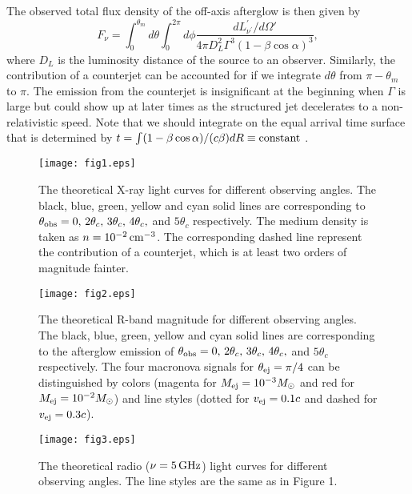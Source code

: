 \documentclass{emulateapj}
\def\beq{\begin{equation}}
\def\enq{\end{equation}}
\begin{document}
The observed total flux density of the off-axis afterglow is then given by \citep{dai01, gra02, kath17}
\beq
F_\nu=\int_0^{\theta_m}d\theta\int_0^{2\pi}d\phi\frac{dL_{\nu^{\prime}}^{\prime}/d\Omega'}{4\pi D_L^2\Gamma^3(1-\beta\cos\alpha)^3},
\enq
where $D_L$ is the luminosity distance of the source to an observer.
Similarly, the contribution of a counterjet can be accounted for if we integrate $d\theta$ from $\pi-\theta_m$ to $\pi$. The emission from the counterjet is insignificant at the beginning when $\Gamma$ is large but could show up at later times as the structured jet decelerates to a non-relativistic speed. Note that we should integrate on the equal arrival time surface that is determined by $t=\int(1-\beta\cos\alpha)/(c\beta)dR\equiv\rm constant$ \citep{wax97, pan98, sa98, huang00, mod00}.

\begin{figure}
\begin{center}
\texttt{[image: fig1.eps]}
\caption{The theoretical X-ray light curves for different observing angles. The black, blue, green, yellow and cyan solid lines are corresponding to $\theta_{\rm obs}=0,\, 2\theta_c,\, 3\theta_c,\,4\theta_c,$ and $ 5\theta_c$ respectively. The medium density is taken as $n=10^{-2}\,\rm cm^{-3}$. The corresponding dashed line represent the contribution of a counterjet, which is at least two orders of magnitude fainter.
\label{fig1}}
\end{center}
\end{figure}

\begin{figure}
\begin{center}
\texttt{[image: fig2.eps]}
\caption{The theoretical R-band magnitude for different observing angles. The black, blue, green, yellow and cyan solid lines are corresponding to the afterglow emission of $\theta_{\rm obs}=0,\, 2\theta_c,\, 3\theta_c,\,4\theta_c,$ and $5\theta_c$ respectively. The four macronova signals for $\theta_{\rm ej}=\pi/4$ can be distinguished by colors (magenta for $M_{\rm ej}=10^{-3}M_{\odot}$ and red for $M_{\rm ej}=10^{-2}M_{\odot}$) and line styles (dotted for $v_{\rm ej}=0.1c$ and dashed for $v_{\rm ej}=0.3c$).
\label{fig2}}
\end{center}
\end{figure}

\begin{figure}
\begin{center}
\texttt{[image: fig3.eps]}
\caption{The theoretical radio ($\nu=5\,\rm GHz$) light curves for different observing angles. The line styles are the same as in Figure 1.
\label{fig3}}
\end{center}
\end{figure}
\end{document}
